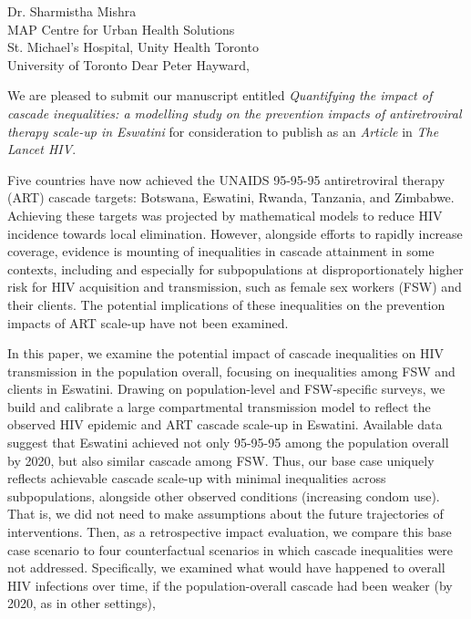 \address{
  Peter Hayward\\
  Editor-in-Chief\\
  The Lancet HIV
}{Dr. Sharmistha Mishra\\
  MAP Centre for Urban Health Solutions\\
  St. Michael's Hospital, Unity Health Toronto\\
  University of Toronto}
Dear Peter Hayward,
\par
We are pleased to submit our manuscript entitled
\emph{Quantifying the impact of cascade inequalities:
  a modelling study on the prevention impacts of antiretroviral therapy scale-up in Eswatini}
for consideration to publish as an \emph{Article} in \emph{The Lancet HIV}.
\par
Five countries have now achieved
the UNAIDS 95-95-95 antiretroviral therapy (ART) cascade targets:
Botswana, Eswatini, Rwanda, Tanzania, and Zimbabwe.
Achieving these targets was projected by
mathematical models to reduce HIV incidence towards local elimination.
However, alongside efforts to rapidly increase coverage,
evidence is mounting of inequalities in cascade attainment in some contexts,
including and especially for subpopulations
at disproportionately higher risk for HIV acquisition and transmission,
such as female sex workers (FSW) and their clients.
The potential implications of these inequalities on
the prevention impacts of ART scale-up have not been examined.
\par
In this paper, we examine the potential impact of
cascade inequalities on HIV transmission in the population overall,
focusing on inequalities among FSW and clients in Eswatini.
Drawing on population-level and FSW-specific surveys,
we build and calibrate a large compartmental transmission model
to reflect the observed HIV epidemic and ART cascade scale-up in Eswatini.
Available data suggest that Eswatini achieved not only
95-95-95 among the population overall by 2020, but also similar cascade among FSW.
Thus, our base case uniquely reflects achievable cascade scale-up
with minimal inequalities across subpopulations,
alongside other observed conditions (\eg increasing condom use).
That is, we did not need to make assumptions about
the future trajectories of interventions.
Then, as a retrospective impact evaluation, we compare
this base case scenario to four counterfactual scenarios in which
cascade inequalities were not addressed.
Specifically, we examined what would have happened to overall HIV infections over time,
if the population-overall cascade had been weaker (\casmd by 2020, as in other settings),
